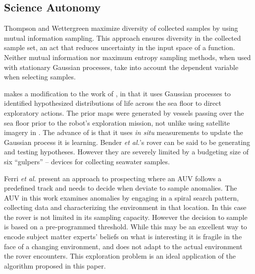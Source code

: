 \subsection{Science Autonomy}


Thompson and Wettergreen \cite{thompson2008intelligent} maximize diversity of
collected samples by using mutual information sampling.  This approach ensures
diversity in the collected sample set, an act that reduces uncertainty in the
input space of a function.  Neither mutual information nor maximum entropy
sampling methods, when used with stationary Gaussian processes, take into
account the dependent variable when selecting samples.  


\cite{bender2013autonomous} makes a modification to the work of
\cite{thompson2008intelligent}, in that it uses Gaussian processes to
identified hypothesized distributions of life across the sea floor to direct
exploratory actions.  The prior maps were generated by vessels passing over the
sea floor prior to the robot's exploration mission, not unlike using satellite
imagery in \cite{thompson2008intelligent}.  The advance of
\cite{bender2013autonomous} is that it uses \emph{in situ} measurements to
update the Gaussian process it is learning.  Bender \emph{et al.}'s rover can
be said to be generating and testing hypotheses.  However they are severely
limited by a budgeting size of six ``gulpers'' -- devices for collecting
seawater samples.


Ferri \emph{et al.} \cite{ferri2010novel} present an approach to prospecting where an AUV follows a predefined track and needs to decide when deviate to sample anomalies.  The AUV in this work examines anomalies by engaging in a spiral search pattern, collecting data and characterizing the environment in that location.  In this case the rover is not limited in its sampling capacity.  However the decision to sample is based on a pre-programmed threshold.  While this may be an excellent way to encode subject matter experts' beliefs on what is interesting it is fragile in the face of a changing environment, and does not adapt to the actual environment the rover encounters.  This exploration problem is an ideal application of the algorithm proposed in this paper.
 
